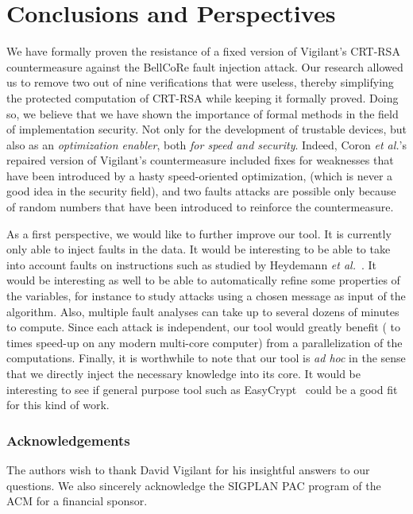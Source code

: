 \documentclass[10pt]{article}
\theoremstyle{definition}
\theoremstyle{theorem}
\newcommand{\etal}{\textit{et al.}\xspace}
\begin{document}
\section{Conclusions and Perspectives}
\label{sec-concl}

We have formally proven the resistance of a fixed version of Vigilant's CRT-RSA countermeasure against the BellCoRe fault injection attack.
Our research allowed us to remove two out of nine verifications that were useless, thereby simplifying the protected computation of CRT-RSA while keeping it formally proved.
Doing so, we believe that we have shown the importance of formal methods in the field of implementation security.
Not only for the development of trustable devices, but also as an \emph{optimization enabler}, both \emph{for speed and security}.
Indeed, Coron \etal's repaired version of Vigilant's countermeasure included fixes for weaknesses that have been introduced by a hasty speed-oriented optimization, (which is never a good idea in the security field),
and two faults attacks are possible only because of random numbers that have been introduced to reinforce the countermeasure.

As a first perspective, we would like to further improve our tool.
It is currently only able to inject faults in the data.
It would be interesting to be able to take into account faults on instructions such as studied by Heydemann \etal~\cite{cryptoeprint:2013:679}.
It would be interesting as well to be able to automatically refine some properties of the variables, for instance to study attacks using a chosen message as input of the algorithm.
Also, multiple fault analyses can take up to several dozens of minutes to compute. Since each attack is independent, our tool would greatly benefit ( to  times speed-up on any modern multi-core computer) from a parallelization of the computations.
Finally, it is worthwhile to note that our tool is {\it ad hoc} in the sense that we directly inject the necessary knowledge into its core.
It would be interesting to see if general purpose tool such as EasyCrypt~\cite{Barthe:2009:POPL} could be a good fit for this kind of work.

\subsubsection*{Acknowledgements}

The authors wish to thank David Vigilant for his insightful answers to our questions.
We also sincerely acknowledge the SIGPLAN PAC program of the ACM for a financial sponsor.
\end{document}
